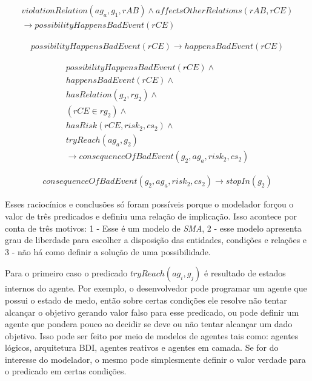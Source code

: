 \begin{eqnarray}
	violationRelation(ag_a,g_1,rAB)  \wedge affectsOtherRelations(rAB,rCE) \nonumber \\
    \to possibilityHappensBadEvent(rCE)  
\end{eqnarray}

\begin{eqnarray}
	possibilityHappensBadEvent(rCE) \to happensBadEvent(rCE) 
\end{eqnarray}

\begin{eqnarray}\label{paybutiamnotguilty}
	possibilityHappensBadEvent(rCE) \wedge  \nonumber \\
    happensBadEvent(rCE) \wedge  \nonumber \\
    hasRelation(g_2,rg_2) \wedge  \nonumber \\
    (rCE \in rg_2) \nonumber \wedge  \nonumber \\
    hasRisk(rCE,risk_2,cs_2) \wedge  \nonumber \\
    tryReach(ag_a,g_2) \nonumber  \nonumber \\
	\to consequenceOfBadEvent(g_2,ag_a,risk_2,cs_2) 
\end{eqnarray}


\begin{eqnarray}\label{badcons}
	consequenceOfBadEvent(g_2,ag_a,risk_2,cs_2) \to stopIn(g_2) 
\end{eqnarray}


Esses raciocínios e conclusões só foram possíveis porque o modelador forçou o valor de três predicados e definiu uma relação de implicação. Isso acontece por conta de três motivos: 1 - Esse é um modelo de \textit{SMA}, 2 - esse modelo apresenta grau de liberdade para escolher a disposição das entidades, condições e relações e 3 - não há como definir a solução de uma possibilidade. 

Para o primeiro caso o predicado $tryReach(ag_i,g_j)$ é resultado de estados internos do agente. Por exemplo, o desenvolvedor pode programar um agente que possui o estado de medo, então sobre certas condições ele resolve não tentar alcançar o objetivo gerando valor falso para esse predicado, ou pode definir um agente que pondera pouco ao decidir se deve ou não tentar alcançar um dado objetivo. Isso pode ser feito por meio de modelos de agentes tais como: agentes lógicos, arquitetura BDI, agentes reativos e agentes em camada. Se for do interesse do modelador, o mesmo pode simplesmente definir o valor verdade para o predicado em certas condições. 


